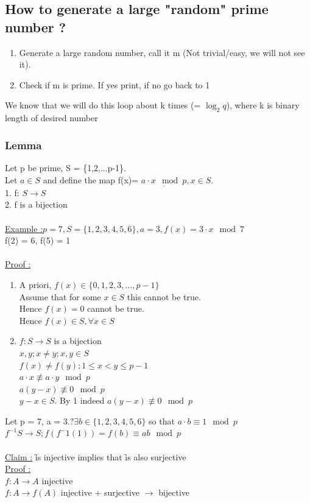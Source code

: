 \documentclass[12pt,a4paper]{article}
\begin{document}
\subsection{How to generate a large "random" prime number ?}
\begin{enumerate}
\item Generate a large random number, call it m (Not trivial/easy, we will not see it).
\item Check if m is prime. If yes print, if no go back to 1
\end{enumerate}
We know that we will do this loop about k times (= $\log_2 q$), where k is binary length of desired number
\subsubsection{Lemma}
Let p be prime, S = \{1,2,...p-1\}.\\
Let $a\in S$ and define the map f(x)= $\underline{a\cdot x \mod p}, x  \in S$.\\
1. f: $S\to S$\\
2. f is a bijection\\
\\
\underline{Example :}$ p = 7, S = \{1,2,3,4,5,6\}, a = 3, f(x) = 3\cdot x \mod 7$\\
f(2) = 6, f(5) = 1\\
\\
\underline{Proof :}
\begin{enumerate}
\item A priori, $f(x) \in \{0,1,2,3,\ldots, p-1\}$\\
Assume that for some $x\in S$ this cannot be true.\\
Hence $f(x) = 0$ cannot be true.\\
Hence $f(x) \in S, \forall x \in S$
\item $f: S \to S$ is a bijection\\
$x,y;x \neq y;x,y \in S$\\
$f(x) \neq f(y); 1 \leq x < y \leq p-1$\\
$a\cdot x \not  \equiv a \cdot y \mod p$\\
$a(y-x) \not \equiv 0 \mod p$\\
$y-x \in S$. By 1 indeed $a(y-x) \not \equiv 0 \mod p$
\end{enumerate}

Let p = 7, a = 3.$ ?\exists b \in \{1,2,3,4,5,6\}$ so that $a\cdot b \equiv 1 \mod p$\\
$f^{-1} S \to S; f(f^-1(1)) = f(b)  \equiv ab \mod p$\\
\\
\underline{Claim :} \f is injective implies that \f is also surjective \\
\underline{Proof :} \\
$f : A \to A$ injective\\
$f :A \to f(A)$ injective + surjective $\to$ bijective
\end{document}
